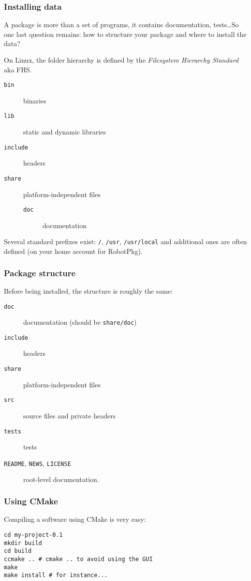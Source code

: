 \documentclass[hyperref={pdfpagelabels=false}]{beamer}
\begin{document}
\begin{frame}[fragile]
\frametitle{Installing data}

A package is more than a set of programs, it contains documentation,
tests\ldots So one last question remains: how to structure your
package and where to install the data?

\vspace{0.3cm}

On Linux, the folder hierarchy is defined by the \textit{Filesystem
  Hierarchy Standard} aka FHS.

\begin{description}
\item[\texttt{bin}] binaries
\item[\texttt{lib}] static and dynamic libraries
\item[\texttt{include}] headers
\item[\texttt{share}] platform-independent files
  \begin{description}
  \item[\texttt{doc}] documentation
  \end{description}
\end{description}

Several standard prefixes exist: \texttt{/}, \texttt{/usr},
\texttt{/usr/local} and additional ones are often defined (on your
home account for RobotPkg).

\end{frame}

\begin{frame}[fragile]
\frametitle{Package structure}

Before being installed, the structure is roughly the same:

\begin{description}
\item[\texttt{doc}] documentation (should be \texttt{share/doc})
\item[\texttt{include}] headers
\item[\texttt{share}] platform-independent files
\item[\texttt{src}] source files and private headers
\item[\texttt{tests}] tests
\item[\texttt{README}, \texttt{NEWS}, \texttt{LICENSE}] root-level
  documentation.
\end{description}
\end{frame}


\begin{frame}[fragile]
\frametitle{Using CMake}

Compiling a software using CMake is very easy:

\begin{verbatim}
cd my-project-0.1
mkdir build
cd build
ccmake .. # cmake .. to avoid using the GUI
make
make install # for instance...
\end{verbatim}

\end{frame}
\end{document}
